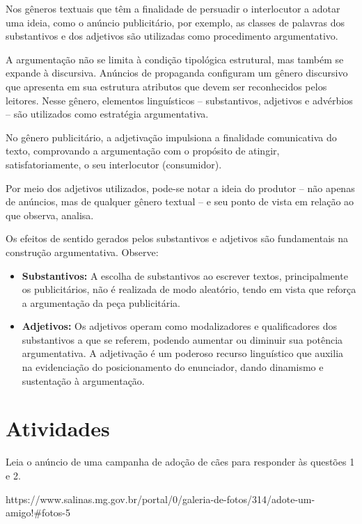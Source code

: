 \begin{itemize}
\begin{itemize}
{Nos gêneros textuais que têm a finalidade de persuadir o interlocutor a
adotar uma ideia, como o anúncio publicitário, por exemplo, as classes
de palavras dos substantivos e dos adjetivos são utilizadas como
procedimento argumentativo.

A argumentação não se limita à condição tipológica estrutural, mas
também se expande à discursiva. Anúncios de propaganda configuram um
gênero discursivo que apresenta em sua estrutura atributos que devem ser
reconhecidos pelos leitores. Nesse gênero, elementos linguísticos --
substantivos, adjetivos e advérbios -- são utilizados como estratégia
argumentativa.

No gênero publicitário, a adjetivação impulsiona a finalidade
comunicativa do texto, comprovando a argumentação com o propósito de
atingir, satisfatoriamente, o seu interlocutor (consumidor).

Por meio dos adjetivos utilizados, pode-se notar a ideia do produtor --
não apenas de anúncios, mas de qualquer gênero textual -- e seu ponto de
vista em relação ao que observa, analisa.

Os efeitos de sentido gerados pelos substantivos e adjetivos são
fundamentais na construção argumentativa. Observe:

\begin{itemize}
\item
  \textbf{Substantivos:} A escolha de substantivos ao escrever textos,
  principalmente os publicitários, não é realizada de modo aleatório,
  tendo em vista que reforça a argumentação da peça publicitária.
\item
  \textbf{Adjetivos:} Os adjetivos operam como modalizadores e
  qualificadores dos substantivos a que se referem, podendo aumentar ou
  diminuir sua potência argumentativa. A adjetivação é um poderoso
  recurso linguístico que auxilia na evidenciação do posicionamento do
  enunciador, dando dinamismo e sustentação à argumentação.
\end{itemize}
}

\section{Atividades}

Leia o anúncio de uma campanha de adoção de cães para responder às
questões 1 e 2.

https://www.salinas.mg.gov.br/portal/0/galeria-de-fotos/314/adote-um-amigo!\#fotos-5


\end{itemize}
\end{itemize}
